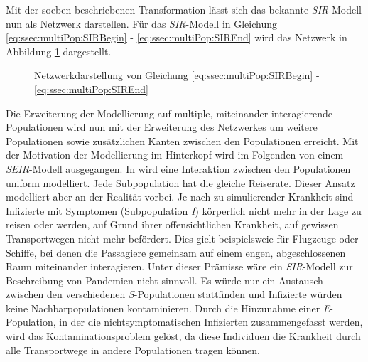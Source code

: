Mit der soeben beschriebenen Transformation lässt sich das bekannte \emph{SIR}-Modell nun als Netzwerk darstellen. Für das \emph{SIR}-Modell in Gleichung \ref{eq:ssec:multiPop:SIRBegin} - \ref{eq:ssec:multiPop:SIREnd} wird das Netzwerk in Abbildung \ref{fig:ssec:multiPop:SIRNet} dargestellt.

\begin{figure}
\begin{center}
\end{center}
\caption{Netzwerkdarstellung von Gleichung \ref{eq:ssec:multiPop:SIRBegin} - \ref{eq:ssec:multiPop:SIREnd}}\label{fig:ssec:multiPop:SIRNet}
\end{figure}

Die Erweiterung der Modellierung auf multiple, miteinander interagierende Populationen wird nun mit der Erweiterung des Netzwerkes um weitere Populationen sowie zusätzlichen Kanten zwischen den Populationen erreicht. Mit der Motivation der Modellierung im Hinterkopf wird im Folgenden von einem \emph{SEIR}-Modell ausgegangen. In \cite{Sattenspiel1995} wird eine Interaktion zwischen den Populationen uniform modelliert. Jede Subpopulation hat die gleiche Reiserate. Dieser Ansatz modelliert aber an der Realität vorbei. Je nach zu simulierender Krankheit sind Infizierte mit Symptomen (Subpopulation \emph{I}) körperlich nicht mehr in der Lage zu reisen oder werden, auf Grund ihrer offensichtlichen Krankheit, auf gewissen Transportwegen nicht mehr befördert. Dies gielt beispielsweie für Flugzeuge oder Schiffe, bei denen die Passagiere gemeinsam auf einem engen, abgeschlossenen Raum miteinander interagieren. Unter dieser Prämisse wäre ein \emph{SIR}-Modell zur Beschreibung von Pandemien nicht sinnvoll. Es würde nur ein Austausch zwischen den verschiedenen \emph{S}-Populationen stattfinden und Infizierte würden keine Nachbarpopulationen kontaminieren.  Durch die Hinzunahme einer \emph{E}-Population, in der die nichtsymptomatischen Infizierten zusammengefasst werden, wird das Kontaminationsproblem gelöst, da diese Individuen die Krankheit durch alle Transportwege in andere Populationen tragen können. 

